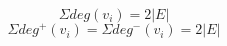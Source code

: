 \documentclass[11pt]{article}
\begin{document}
$$\Sigma deg(v_i) = 2|E|$$
$$\Sigma deg^+(v_i) = \Sigma deg^-(v_i) = 2 |E|$$
\end{document}
